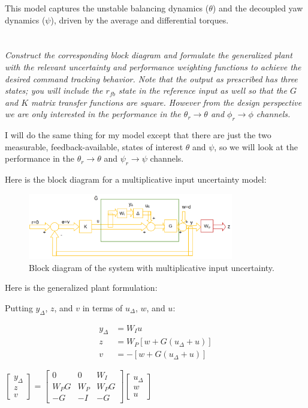 \documentclass{article}
\begin{document}
This model captures the unstable balancing dynamics (\( \theta \)) and the decoupled yaw dynamics (\( \psi \)), driven by the average and differential torques.

\section{}
\textit{Construct the corresponding block diagram and formulate the generalized plant with the relevant uncertainty and performance weighting functions to achieve the desired command tracking behavior. Note that the output as prescribed has three states; you will include the $r_{fb}$ state in the reference input as well so that the $G$ and $K$ matrix transfer functions are square. However from the design perspective we are only interested in the performance in the $\theta_r \rightarrow \theta$ and $\phi_r \rightarrow \phi$ channels.}

I will do the same thing for my model except that there are just the two measurable, feedback-available, states of interest $\theta$ and $\psi$, so we will look at the performance in the $\theta_r \rightarrow \theta$ and $\psi_r \rightarrow \psi$ channels.

Here is the block diagram for a multiplicative input uncertainty model:

\begin{figure}[H]
    \centering
    \includegraphics[width=0.8\textwidth]{blockDiagram.png}
    \caption{Block diagram of the system with multiplicative input uncertainty.}
    \label{fig:blockDiagram}    
\end{figure}

Here is the generalized plant formulation:

Putting $y_\Delta$, $z$, and $v$ in terms of $u_\Delta$, $w$, and $u$:

\begin{align}
    y_\Delta &= W_I u \\
    z &= W_P [w + G(u_\Delta + u)] \\
    v &= -[w + G(u_\Delta + u)] 
\end{align}

$\begin{bmatrix} y_\Delta \\ z \\ v \end{bmatrix} = \begin{bmatrix} 0 & 0 & W_I \\ W_P G & W_P & W_P G \\ -G & -I & -G \end{bmatrix} \begin{bmatrix} u_\Delta \\ w \\ u \end{bmatrix}$
\end{document}
